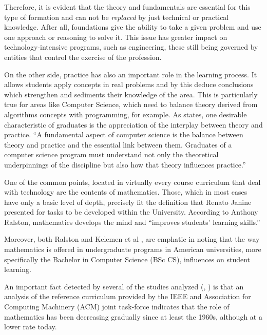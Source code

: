 \documentclass[conference]{IEEEtran}
\begin{document}
	Therefore, it is evident that the theory and fundamentals are essential for this type of formation and can not be \emph{replaced} by just technical or practical knowledge. After all, foundations give the ability to take a given problem and use one approach or reasoning to solve it. This issue has greater impact on technology-intensive programs, such as engineering, these still being governed by entities that control the exercise of the profession.

	On the other side, practice has also an important role in the learning process. It allows students apply concepts in real problems and by this deduce conclusions which strengthen and sediments their knowledge of the area. This is particularly true for areas like Computer Science, which need to balance theory derived from algorithms concepts with programming, for example. As \cite{cs2008} states, one desirable characteristic of graduates is the appreciation of the interplay between theory and practice. ``A fundamental aspect of computer science is the balance between theory and practice and the essential link between them. Graduates of a computer science program must understand not only the theoretical underpinnings of the discipline but also how that theory
influences practice.''

	One of the common points, located in virtually every course curriculum that deal with technology are the contents of mathematics. Those, which in most cases have only a basic level of depth, precisely fit the definition that Renato Janine presented for tasks to be developed within the University. According to Anthony Ralston, mathematics develops the mind and ``improves students' learning skills.'' \cite{ralston:do_need_mathematics}

	Moreover, both Ralston and Kelemen et al \cite{kelemen:has_become_math_phobic}, are emphatic in noting that the way mathematics is offered in undergraduate programs in American universities, more specifically the Bachelor in Computer Science (BSc CS), influences on student learning.

	An important fact detected by several of the studies analyzed (\cite{ralston:do_need_mathematics}, \cite{tucker:our_curriculum_math_phobic}) is that an analysis of the reference curriculum provided by the IEEE and Association for Computing Machinery (ACM) joint task-force \cite{cs2001} \cite{cs2008} indicates that the role of mathematics has been decreasing gradually since at least the 1960s, although at a lower rate today.
\end{document}

